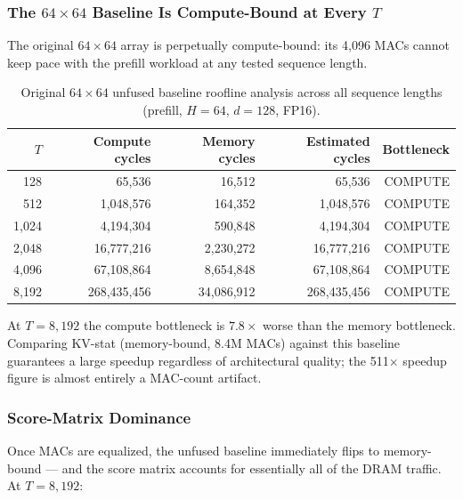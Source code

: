 \documentclass[11pt]{article}
\begin{document}
\subsubsection*{The \(64 \times 64\) Baseline Is Compute-Bound at Every \(T\)}

The original \(64 \times 64\) array is perpetually compute-bound:
its 4,096 MACs cannot keep pace with the prefill workload at any
tested sequence length.

\begin{table}[H]
\centering
\caption{Original \(64 \times 64\) unfused baseline roofline analysis
across all sequence lengths (prefill, \(H=64\), \(d=128\), FP16).}
\label{tab:baseline_orig}
\begin{tabular}{rrrrr}
\toprule
\(T\) & Compute cycles & Memory cycles & Estimated cycles & Bottleneck \\
\midrule
128   &      65,536 &      16,512 &      65,536 & COMPUTE \\
512   &   1,048,576 &     164,352 &   1,048,576 & COMPUTE \\
1,024 &   4,194,304 &     590,848 &   4,194,304 & COMPUTE \\
2,048 &  16,777,216 &   2,230,272 &  16,777,216 & COMPUTE \\
4,096 &  67,108,864 &   8,654,848 &  67,108,864 & COMPUTE \\
8,192 & 268,435,456 &  34,086,912 & 268,435,456 & COMPUTE \\
\bottomrule
\end{tabular}
\end{table}

At \(T = 8{,}192\) the compute bottleneck is \(7.8\times\) worse
than the memory bottleneck.
Comparing KV-stat (memory-bound, 8.4M MACs) against this baseline
guarantees a large speedup regardless of architectural quality;
the 511$\times$ speedup figure is almost entirely a MAC-count artifact.

\subsubsection*{Score-Matrix Dominance}

Once MACs are equalized, the unfused baseline immediately flips
to memory-bound --- and the score matrix accounts for essentially
all of the DRAM traffic.
At \(T = 8{,}192\):
\end{document}
